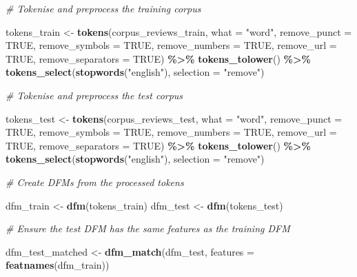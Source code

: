 \documentclass[
]{book}
\newenvironment{Shaded}{\begin{snugshade}}{\end{snugshade}}
\newcommand{\AttributeTok}[1]{\textcolor[rgb]{0.13,0.29,0.53}{#1}}
\newcommand{\CommentTok}[1]{\textcolor[rgb]{0.56,0.35,0.01}{\textit{#1}}}
\newcommand{\ConstantTok}[1]{\textcolor[rgb]{0.56,0.35,0.01}{#1}}
\newcommand{\FunctionTok}[1]{\textcolor[rgb]{0.13,0.29,0.53}{\textbf{#1}}}
\newcommand{\NormalTok}[1]{#1}
\newcommand{\OtherTok}[1]{\textcolor[rgb]{0.56,0.35,0.01}{#1}}
\newcommand{\SpecialCharTok}[1]{\textcolor[rgb]{0.81,0.36,0.00}{\textbf{#1}}}
\newcommand{\StringTok}[1]{\textcolor[rgb]{0.31,0.60,0.02}{#1}}
\begin{document}
\begin{Shaded}
\begin{Highlighting}[]
\CommentTok{\# Tokenise and preprocess the training corpus}

\NormalTok{tokens\_train }\OtherTok{\textless{}{-}} \FunctionTok{tokens}\NormalTok{(corpus\_reviews\_train, }\AttributeTok{what =} \StringTok{"word"}\NormalTok{, }\AttributeTok{remove\_punct =} \ConstantTok{TRUE}\NormalTok{,}
    \AttributeTok{remove\_symbols =} \ConstantTok{TRUE}\NormalTok{, }\AttributeTok{remove\_numbers =} \ConstantTok{TRUE}\NormalTok{, }\AttributeTok{remove\_url =} \ConstantTok{TRUE}\NormalTok{, }\AttributeTok{remove\_separators =} \ConstantTok{TRUE}\NormalTok{) }\SpecialCharTok{\%\textgreater{}\%}
    \FunctionTok{tokens\_tolower}\NormalTok{() }\SpecialCharTok{\%\textgreater{}\%}
    \FunctionTok{tokens\_select}\NormalTok{(}\FunctionTok{stopwords}\NormalTok{(}\StringTok{"english"}\NormalTok{), }\AttributeTok{selection =} \StringTok{"remove"}\NormalTok{)}

\CommentTok{\# Tokenise and preprocess the test corpus}

\NormalTok{tokens\_test }\OtherTok{\textless{}{-}} \FunctionTok{tokens}\NormalTok{(corpus\_reviews\_test, }\AttributeTok{what =} \StringTok{"word"}\NormalTok{, }\AttributeTok{remove\_punct =} \ConstantTok{TRUE}\NormalTok{, }\AttributeTok{remove\_symbols =} \ConstantTok{TRUE}\NormalTok{,}
    \AttributeTok{remove\_numbers =} \ConstantTok{TRUE}\NormalTok{, }\AttributeTok{remove\_url =} \ConstantTok{TRUE}\NormalTok{, }\AttributeTok{remove\_separators =} \ConstantTok{TRUE}\NormalTok{) }\SpecialCharTok{\%\textgreater{}\%}
    \FunctionTok{tokens\_tolower}\NormalTok{() }\SpecialCharTok{\%\textgreater{}\%}
    \FunctionTok{tokens\_select}\NormalTok{(}\FunctionTok{stopwords}\NormalTok{(}\StringTok{"english"}\NormalTok{), }\AttributeTok{selection =} \StringTok{"remove"}\NormalTok{)}

\CommentTok{\# Create DFMs from the processed tokens}

\NormalTok{dfm\_train }\OtherTok{\textless{}{-}} \FunctionTok{dfm}\NormalTok{(tokens\_train)}
\NormalTok{dfm\_test }\OtherTok{\textless{}{-}} \FunctionTok{dfm}\NormalTok{(tokens\_test)}

\CommentTok{\# Ensure the test DFM has the same features as the training DFM}

\NormalTok{dfm\_test\_matched }\OtherTok{\textless{}{-}} \FunctionTok{dfm\_match}\NormalTok{(dfm\_test, }\AttributeTok{features =} \FunctionTok{featnames}\NormalTok{(dfm\_train))}


\end{Highlighting}
\end{Shaded}
\end{document}
